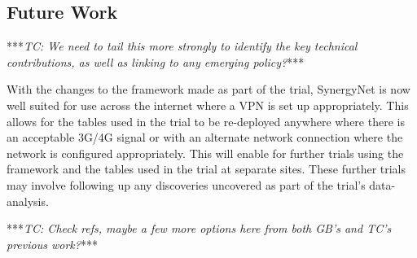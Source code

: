\documentclass[a4paper,11pt]{article}
\begin{document}
\subsection{Future Work}

***{\emph{TC: We need to tail this more strongly to identify the key technical contributions, as well as linking to any emerging policy?}}***

With the changes to the framework made as part of the trial, SynergyNet is now well suited for use across the internet where a VPN is set up appropriately.
This allows for the tables used in the trial to be re-deployed anywhere where there is an acceptable 3G/4G signal or with an alternate network connection where the network is configured appropriately.
This will enable for further trials using the framework and the tables used in the trial at separate sites.
These further trials may involve following up any discoveries uncovered as part of the trial's data-analysis.

***{\emph{TC: Check refs, maybe a few more options here from both GB's and TC's previous work?}}***



\end{document}
